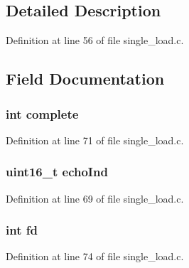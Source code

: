 \subsection{Detailed Description}


Definition at line 56 of file single\+\_\+load.\+c.



\subsection{Field Documentation}
\subsubsection[{\texorpdfstring{complete}{complete}}]{\setlength{\rightskip}{0pt plus 5cm}int complete}\hypertarget{structstate_slot__t_a520408f4775914f7510cc59db5a60b38}{}\label{structstate_slot__t_a520408f4775914f7510cc59db5a60b38}


Definition at line 71 of file single\+\_\+load.\+c.

\subsubsection[{\texorpdfstring{echo\+Ind}{echoInd}}]{\setlength{\rightskip}{0pt plus 5cm}uint16\+\_\+t echo\+Ind}\hypertarget{structstate_slot__t_a4551e8f3f7a24f8ef0b830e4b8ef8e96}{}\label{structstate_slot__t_a4551e8f3f7a24f8ef0b830e4b8ef8e96}


Definition at line 69 of file single\+\_\+load.\+c.

\subsubsection[{\texorpdfstring{fd}{fd}}]{\setlength{\rightskip}{0pt plus 5cm}int fd}\hypertarget{structstate_slot__t_a6f8059414f0228f0256115e024eeed4b}{}\label{structstate_slot__t_a6f8059414f0228f0256115e024eeed4b}


Definition at line 74 of file single\+\_\+load.\+c.

